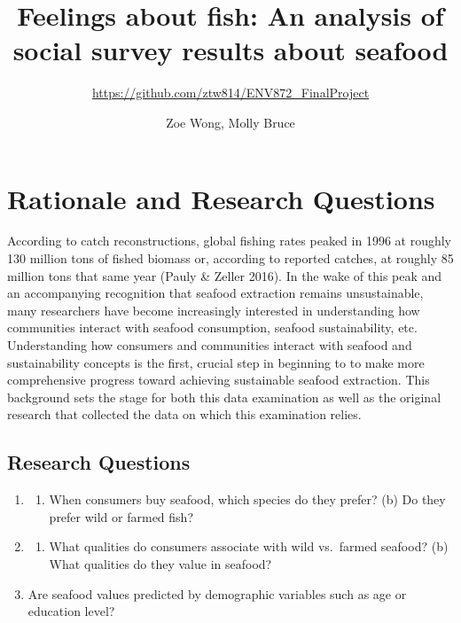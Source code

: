 \documentclass[
  12pt,
]{article}
\title{Feelings about fish: An analysis of social survey results about
seafood}
\subtitle{\url{https://github.com/ztw814/ENV872_FinalProject}}
\author{Zoe Wong, Molly Bruce}
\date{}
\providecommand{\tightlist}{%
  \setlength{\itemsep}{0pt}\setlength{\parskip}{0pt}}
\begin{document}
\maketitle

\newpage
\tableofcontents 
\newpage
\listoffigures 
\newpage

\hypertarget{rationale-and-research-questions}{%
\section{Rationale and Research
Questions}\label{rationale-and-research-questions}}

According to catch reconstructions, global fishing rates peaked in 1996
at roughly 130 million tons of fished biomass or, according to reported
catches, at roughly 85 million tons that same year (Pauly \& Zeller
2016). In the wake of this peak and an accompanying recognition that
seafood extraction remains unsustainable, many researchers have become
increasingly interested in understanding how communities interact with
seafood consumption, seafood sustainability, etc. Understanding how
consumers and communities interact with seafood and sustainability
concepts is the first, crucial step in beginning to to make more
comprehensive progress toward achieving sustainable seafood extraction.
This background sets the stage for both this data examination as well as
the original research that collected the data on which this examination
relies.

\hypertarget{research-questions}{%
\subsection{Research Questions}\label{research-questions}}

\begin{enumerate}
\def\labelenumi{\arabic{enumi}.}
\item
  \begin{enumerate}
  \def\labelenumii{(\alph{enumii})}
  \tightlist
  \item
    When consumers buy seafood, which species do they prefer? (b) Do
    they prefer wild or farmed fish?
  \end{enumerate}
\item
  \begin{enumerate}
  \def\labelenumii{(\alph{enumii})}
  \tightlist
  \item
    What qualities do consumers associate with wild vs.~farmed seafood?
    (b) What qualities do they value in seafood?
  \end{enumerate}
\item
  Are seafood values predicted by demographic variables such as age or
  education level?
\end{enumerate}
\end{document}
